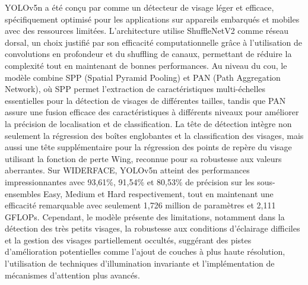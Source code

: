 \begin{onehalfspace}
\hspace{0.65cm} YOLOv5n a été conçu par \cite{Qi2021YOLO5FaceWR} comme un détecteur de visage léger et efficace, spécifiquement optimisé pour les applications sur appareils embarqués et mobiles avec des ressources limitées. L'architecture utilise ShuffleNetV2 comme réseau dorsal, un choix justifié par son efficacité computationnelle grâce à l'utilisation de convolutions en profondeur et du shuffling de canaux, permettant de réduire la complexité tout en maintenant de bonnes performances. Au niveau du cou, le modèle combine SPP (Spatial Pyramid Pooling) et PAN (Path Aggregation Network), où SPP permet l'extraction de caractéristiques multi-échelles essentielles pour la détection de visages de différentes tailles, tandis que PAN assure une fusion efficace des caractéristiques à différents niveaux pour améliorer la précision de localisation et de classification. La tête de détection intègre non seulement la régression des boîtes englobantes et la classification des visages, mais aussi une tête supplémentaire pour la régression des points de repère du visage utilisant la fonction de perte Wing, reconnue pour sa robustesse aux valeurs aberrantes. Sur WIDERFACE, YOLOv5n atteint des performances impressionnantes avec 93,61\%, 91,54\% et 80,53\% de précision sur les sous-ensembles Easy, Medium et Hard respectivement, tout en maintenant une efficacité remarquable avec seulement 1,726 million de paramètres et 2,111 GFLOPs. Cependant, le modèle présente des limitations, notamment dans la détection des très petits visages, la robustesse aux conditions d'éclairage difficiles et la gestion des visages partiellement occultés, suggérant des pistes d'amélioration potentielles comme l'ajout de couches à plus haute résolution, l'utilisation de techniques d'illumination invariante et l'implémentation de mécanismes d'attention plus avancés.



\end{onehalfspace}
